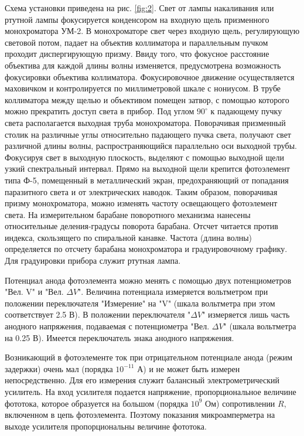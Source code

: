 Схема установки приведена на рис. \ref{fig:2}. Свет от лампы накаливания или ртутной лампы фокусируется конденсором на входную щель призменного монохроматора УМ-2. В монохроматоре свет через входную щель, регулирующую световой потом, падает на объектив коллиматора и параллельным пучком проходит диспергирующую призму. Ввиду того, что фокусное расстояние объектива для каждой длины волны изменяется, предусмотрена возможность фокусировки объектива коллиматора. Фокусировочное движение осуществляется маховичком и контролируется по миллиметровой шкале с нониусом. В трубе коллиматора между щелью и объективом помещен затвор, с помощью которого можно прекратить доступ света в прибор. Под углом $90^{\circ}$ к падающему пучку света располагается выходная труба монохроматора. Поворачивая призменный столик на различные углы относительно падающего пучка света, получают свет различной длины волны, распространяющийся параллельно оси выходной трубы. Фокусируя свет в выходную плоскость, выделяют с помощью выходной щели узкий спектральный интервал. Прямо на выходной щели крепится фотоэлемент типа Ф-5, помещенный в металлический экран, предохраняющий от попадания паразитного света и от электрических наводок. Таким образом, поворачивая призму монохроматора, можно изменять частоту освещающего фотоэлемент света. На измерительном барабане поворотного механизма нанесены относительные деления-градусы поворота барабана. Отсчет читается против индекса, скользящего по спиральной канавке. Частота (длина волны) определяется по отсчету барабана монохроматора и градуировочному графику. Для градуировки прибора служит ртутная лампа.

Потенциал анода фотоэлемента можно менять с помощью двух потенциометров "Вел. V" и "Вел. $\Delta V$". Величина потенциала измеряется вольтметром при положении переключателя "Измерение" на "V" (шкала вольтметра при этом соответствует 2.5 В). В положении переключателя "$\Delta V$" измеряется лишь часть анодного напряжения, подаваемая с потенциометра "Вел. $\Delta V$" (шкала вольтметра на 0.25 В). Имеется переключатель знака анодного напряжения.

Возникающий в фотоэлементе ток при отрицательном потенциале анода (режим задержки) очень мал (порядка $10^{-11}$ А) и не может быть измерен непосредственно. Для его измерения служит балансный электрометрический усилитель. На вход усилителя подается напряжение, пропорциональное величине фототока, которое образуется на большом (порядка $10^9$ Ом) сопротивлении $R$, включенном в цепь фотоэлемента. Поэтому показания микроамперметра на выходе усилителя пропорциональны величине фототока.

